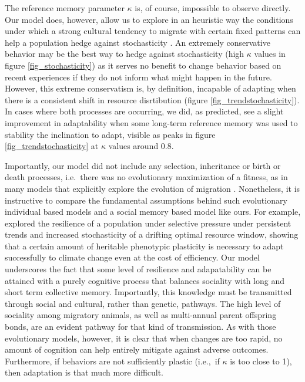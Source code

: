\documentclass[utf8]{frontiersSCNS} %
\begin{document}
	The reference memory parameter $\kappa$ is, of course, impossible to observe directly. Our model does, however, allow us to explore in an heuristic way the conditions under which a strong cultural tendency to migrate with certain fixed patterns can help a population hedge against stochasticity \citep{Abrahms2019,Fagan2019b}.  An extremely conservative behavior may be the best way to hedge against stochasticity (high $\kappa$ values in figure \ref{fig_stochasticity}) as it serves no benefit to change behavior based on recent experiences if they do not inform what might happen in the future. However, this extreme conservatism is, by definition, incapable of adapting when there is a consistent shift in resource disrtibution (figure \ref{fig_trendstochasticity}).  In cases where both processes are occurring, we did, as predicted, see a slight improvement in adaptability when some long-term reference memory was used to stability the inclination to adapt, visible as peaks in figure \ref{fig_trendstochasticity} at $\kappa$ values around 0.8. 
	
	Importantly, our model did not include any selection, inheritance or birth or death processes, i.e.~there was no evolutionary maximization of a fitness, as in many models that explicitly explore the evolution of migration \citep[e.g.][]{Guttal2010, Shaw2013, Anderson2013}. Nonetheless, it is instructive to compare the fundamental assumptions behind such evolutionary individual based models and a social memory based model like ours. For example, \citet{Anderson2013} explored the resilience of a population under selective pressure under persistent trends and increased stochasticity of a drifting optimal resource window, showing that a certain amount of heritable phenotypic plasticity is necessary to adapt successfully to climate change even at the cost of efficiency. Our model underscores the fact that some level of resilience and adapatability can be attained with a purely cognitive process that balances sociality with long and short term collective memory. Importantly, this knowledge must be transmitted through social and cultural, rather than genetic, pathways.  The high level of sociality among migratory animals, as well as multi-annual parent offspring bonds, are an evident pathway for that kind of transmission.  As with those evolutionary models, however, it is clear that when changes are too rapid, no amount of cognition can help entirely mitigate against adverse outcomes. Furthermore, if behaviors are not sufficiently plastic (i.e.,~if $\kappa$ is too close to 1), then adaptation is that much more difficult.
	
\end{document}

